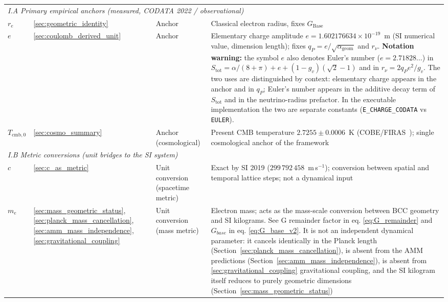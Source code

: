 \documentclass[10pt,a4paper]{article}
\begin{document}
{\begin{longtable}{@{}p{3.2cm}p{1.8cm}p{2.6cm}p{6.0cm}@{}}
		\bottomrule
		\endlastfoot
		\multicolumn{4}{l}{\textit{I. Primary inputs and exact conversions}} \\
		\midrule
		\multicolumn{4}{l}{\textit{I.A Primary empirical anchors (measured, CODATA 2022 / observational)}} \\
		\midrule
		$r_e$ & \ref{sec:geometric_identity} & Anchor & Classical electron radius, fixes $G_{\text{Base}}$ \\
		$e$    & \ref{sec:coulomb_derived_unit} & Anchor & Elementary charge amplitude $e = 1.602176634 \times 10^{-19}$~m (SI numerical value, dimension length); fixes $q_P = e/\sqrt{\alpha_{\text{geom}}}$ and $r_\nu$. \textbf{Notation warning:} the symbol $e$ also denotes Euler's number ($e = 2.71828\ldots$) in $S_{\text{tot}} = \alpha/(8+\pi) + e + (1-g_v)(\sqrt{2}-1)$ and in $r_\nu = 2 q_P e^2/g_v$. The two uses are distinguished by context: elementary charge appears in the anchor and in $q_P$; Euler's number appears in the additive decay term of $S_{\text{tot}}$ and in the neutrino-radius prefactor. In the executable implementation the two are separate constants (\texttt{E\_CHARGE\_CODATA} vs \texttt{EULER}). \\
		$T_{\text{cmb},0}$ & \ref{sec:cosmo_summary} & Anchor (cosmological) & Present CMB temperature $2.7255 \pm 0.0006$~K (COBE/FIRAS~\cite{Fixsen2009}); single cosmological anchor of the framework \\
		\midrule
		\midrule
		\multicolumn{4}{l}{\quad\textit{I.B Metric conversions (unit bridges to the SI system)}} \\
		\midrule
		$c$    & \ref{sec:c_as_metric} & Unit conversion (spacetime metric) & Exact by SI 2019 ($299\,792\,458$~m\,s$^{-1}$); conversion between spatial and temporal lattice steps; not a dynamical input \\
		$m_e$  & \ref{sec:mass_geometric_status}, \ref{sec:planck_mass_cancellation}, \ref{sec:amm_mass_independence}, \ref{sec:gravitational_coupling} & Unit conversion (mass metric) & Electron mass; acts as the mass-scale conversion between BCC geometry and SI kilograms. See G remainder factor in eq. \ref{eq:G_remainder} and $G_{base}$ in eq. \ref{eq:G_base_v2}. It is not an independent dynamical parameter: it cancels identically in the Planck length (Section~\ref{sec:planck_mass_cancellation}), is absent from the AMM predictions (Section~\ref{sec:amm_mass_independence}), is absent from \ref{sec:gravitational_coupling} gravitational coupling, and the SI kilogram itself reduces to purely geometric dimensions (Section~\ref{sec:mass_geometric_status}) \\

\end{longtable}}
\end{document}
